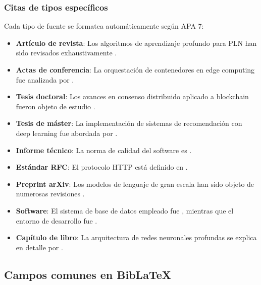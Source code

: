 \subsubsection{Citas de tipos específicos}

Cada tipo de fuente se formatea automáticamente según APA 7:

\begin{itemize}
  \item \textbf{Artículo de revista}: Los algoritmos de aprendizaje profundo para PLN
    han sido revisados exhaustivamente \parencite{chen2023}.
  \item \textbf{Actas de conferencia}: La orquestación de contenedores en edge computing
    fue analizada por \textcite{liu2024}.
  \item \textbf{Tesis doctoral}: Los avances en consenso distribuido aplicado a blockchain
    fueron objeto de estudio \parencite{wilson2024}.
  \item \textbf{Tesis de máster}: La implementación de sistemas de recomendación con deep
    learning fue abordada por \textcite{fernandez2023}.
  \item \textbf{Informe técnico}: La norma de calidad del software es \parencite{iso25010}.
  \item \textbf{Estándar RFC}: El protocolo HTTP está definido en \parencite{rfc9110}.
  \item \textbf{Preprint arXiv}: Los modelos de lenguaje de gran escala han sido
    objeto de numerosas revisiones \parencite{arxiv2024}.
  \item \textbf{Software}: El sistema de base de datos empleado fue
    \textcite{postgresql2024}, mientras que el entorno de desarrollo fue
    \textcite{vscode2024}.
  \item \textbf{Capítulo de libro}: La arquitectura de redes neuronales profundas
    se explica en detalle por \textcite{bishop2023}.
\end{itemize}

\subsection{Campos comunes en BibLaTeX}
\label{subsec:campos-biblatex}

